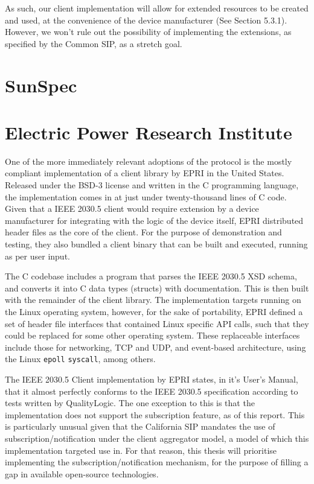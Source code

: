 As such, our client implementation will allow for extended resources to be created and used, at the convenience of the device manufacturer (See Section 5.3.1). 
However, we won't rule out the possibility of implementing the extensions, as specified by the Common SIP, as a stretch goal. 
\section{SunSpec}


\section{Electric Power Research Institute}
One of the more immediately relevant adoptions of the protocol is the mostly compliant implementation of a client library by EPRI in the United States.
Released under the BSD-3 license and written in the C programming language, the implementation comes in at just under twenty-thousand lines of C code.
Given that a IEEE 2030.5 client would require extension by a device manufacturer for integrating with the logic of the device itself, EPRI distributed header files as the core of the client.
For the purpose of demonstration and testing, they also bundled a client binary that can be built and executed, running as per user input.

The C codebase includes a program that parses the IEEE 2030.5 XSD schema, and converts it into C data types (structs) with documentation. This is then built with the remainder of the client library.
The implementation targets running on the Linux operating system, however, for the sake of portability, EPRI defined a set of header file interfaces that contained Linux specific API calls, such that they could be replaced for some other operating system.
These replaceable interfaces include those for networking, TCP and UDP, and event-based architecture, using the Linux \texttt{epoll} \texttt{syscall}, among others.

The IEEE 2030.5 Client implementation by EPRI states, in it's User's Manual, that it almost perfectly conforms to the IEEE 2030.5 specification according to tests written by QualityLogic.
The one exception to this is that the implementation does not support the subscription feature, as of this report.
This is particularly unusual given that the California SIP mandates the use of subscription/notification under the client aggregator model, a model of which this implementation targeted use in.
For that reason, this thesis will prioritise implementing the subscription/notification mechanism, for the purpose of filling a gap in available open-source technologies.
\cite[]{eprimanual}





